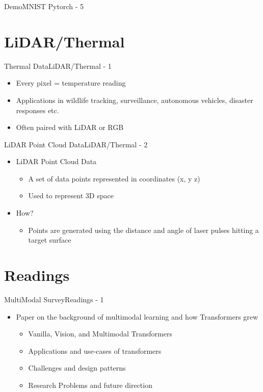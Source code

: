 \documentclass{beamer}
\begin{document}
\begin{frame}{Demo}{MNIST Pytorch - 5}
\end{frame}

\section{LiDAR/Thermal}
\begin{frame}{Thermal Data}{LiDAR/Thermal - 1}
\begin{itemize}
	\item Every pixel = temperature reading
	\item Applications in wildlife tracking, surveillance, autonomous vehicles, disaster responses etc.
	\item Often paired with LiDAR or RGB 
\end{itemize}
\end{frame}

\begin{frame}{LiDAR Point Cloud Data}{LiDAR/Thermal - 2}
\begin{itemize}
	\item LiDAR Point Cloud Data
	\begin{itemize}
		\item A set of data points represented in coordinates (x, y z)
		\item Used to represent 3D space
	\end{itemize}
	\item How?
	\begin{itemize}
		\item Points are generated using the distance and angle of laser pulses hitting a target surface
	\end{itemize}
\end{itemize}
\end{frame}


\section{Readings}
\begin{frame}{MultiModal Survey}{Readings - 1}
\begin{itemize}
	\item Paper on the background of multimodal learning and how Transformers grew
	\begin{itemize}
		\item Vanilla, Vision, and Multimodal Transformers
		\item Applications and use-cases of transformers
		\item Challenges and design patterns
		\item Research Problems and future direction
	\end{itemize}
\end{itemize}
\end{frame}
\end{document}
